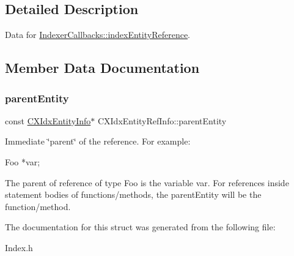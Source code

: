\subsection{Detailed Description}
Data for \mbox{\hyperlink{structIndexerCallbacks_a6d93809e7743a590beafa0387ac145dc}{Indexer\+Callbacks\+::index\+Entity\+Reference}}. 

\subsection{Member Data Documentation}
\mbox{\label{structCXIdxEntityRefInfo_aa01a3ce2b823d13984eed3ab0676a3b7}} 
\subsubsection{\texorpdfstring{parent\+Entity}{parentEntity}}
{\footnotesize\ttfamily const \mbox{\hyperlink{structCXIdxEntityInfo}{C\+X\+Idx\+Entity\+Info}}$\ast$ C\+X\+Idx\+Entity\+Ref\+Info\+::parent\+Entity}



Immediate \char`\"{}parent\char`\"{} of the reference. For example\+: 


\begin{DoxyCode}
Foo *var;
\end{DoxyCode}


The parent of reference of type \textquotesingle{}Foo\textquotesingle{} is the variable \textquotesingle{}var\textquotesingle{}. For references inside statement bodies of functions/methods, the parent\+Entity will be the function/method. 

The documentation for this struct was generated from the following file\+:\begin{DoxyCompactItemize}
\item 
Index.\+h\end{DoxyCompactItemize}
